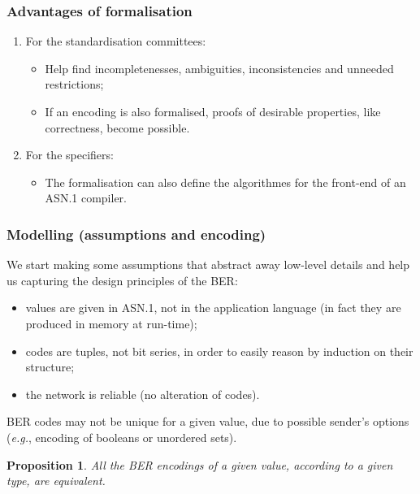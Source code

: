 \documentclass[compress,dvips,xcolor={dvipsnames},t]{beamer}
\newtheorem{proposition}{Proposition}
\newcommand\ASN{\textsf{ASN.1}\xspace}
\begin{document}
\begin{frame}
\frametitle{Advantages of formalisation}

\begin{enumerate}

  \item For the standardisation committees:
    \begin{itemize}

    \item Help find incompletenesses, ambiguities, inconsistencies and
      unneeded restrictions;

    \item If an encoding is also formalised, proofs of desirable
      properties, like correctness, become possible.

    \end{itemize}

  \item For the specifiers:
    \begin{itemize}
      
      \item The formalisation can also define the algorithmes for the
        front-end of an \ASN compiler.
        
    \end{itemize}
    
\end{enumerate}

\end{frame}

\begin{frame}
\frametitle{Modelling (assumptions and encoding)}

We start making some assumptions that abstract away low-level details
and help us capturing the design principles of the BER:
\begin{itemize}

  \item values are given in \ASN, not in the application language (in
  fact they are produced in memory at run-time);

  \item codes are tuples, not bit series, in order to easily reason by
  induction on their structure;

  \item the network is reliable (no alteration of codes).

\end{itemize}
BER codes may not be unique for a given value, due to possible
sender's options (\emph{e.g.}, encoding of booleans or unordered
sets).
\begin{proposition}
All the BER encodings of a given value, according to a given type, are
equivalent.
\end{proposition}

\end{frame}
\end{document}
